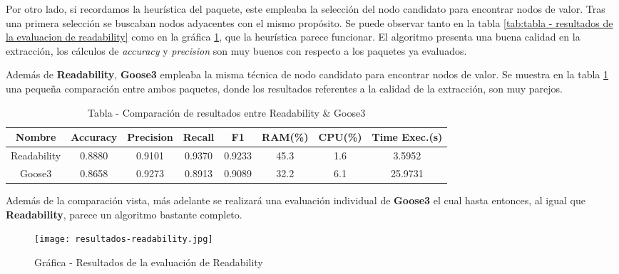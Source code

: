 Por otro lado, si recordamos la heurística del paquete, este empleaba la selección del nodo candidato para
encontrar nodos de valor. Tras una primera selección se buscaban nodos adyacentes con el mismo propósito.
Se puede observar tanto en la tabla \ref{tab:tabla - resultados de la evaluacion de readability} como en
la gráfica \ref{img:grafica - resultados de la evaluacion de readability}, que la heurística parece funcionar.
El algoritmo presenta una buena calidad en la extracción, los cálculos de \emph{accuracy} y \emph{precision}
son muy buenos con respecto a los paquetes ya evaluados.

Además de \textbf{Readability}, \textbf{Goose3} empleaba la misma técnica de nodo candidato para encontrar
nodos de valor. Se muestra en la tabla \ref{tab:tabla - comparacion de resultados entre readability y goose3} 
una pequeña comparación entre ambos paquetes, donde los resultados referentes a la calidad de la extracción, 
son muy parejos.

\begin{table}[h]
    \begin{center}
      \begin{tabular}{| c | c | c | c | c | c | c | c |} \hline 
       \textbf{Nombre} & \textbf{Accuracy} & \textbf{Precision}  & \textbf{Recall} & \textbf{F1} & \textbf{RAM(\%)} & \textbf{CPU(\%)} & \textbf{Time Exec.(s)} \\ \hline
       Readability & 0.8880 & 0.9101 & 0.9370 & 0.9233 & 45.3 & 1.6 & 3.5952 \\ \hline
       Goose3 & 0.8658 & 0.9273 & 0.8913 & 0.9089 & 32.2 & 6.1 & 25.9731 \\ \hline
      \end{tabular}
      \caption{Tabla - Comparación de resultados entre Readability \& Goose3}
      \label{tab:tabla - comparacion de resultados entre readability y goose3}
    \end{center}
\end{table}

Además de la comparación vista, más adelante se realizará una evaluación individual de \textbf{Goose3} el
cual hasta entonces, al igual que \textbf{Readability}, parece un algoritmo bastante completo.

\begin{figure}[tphb]
    \centering
    \texttt{[image: resultados-readability.jpg]}
    \caption{Gráfica - Resultados de la evaluación de Readability}
    \label{img:grafica - resultados de la evaluacion de readability}
\end{figure}

